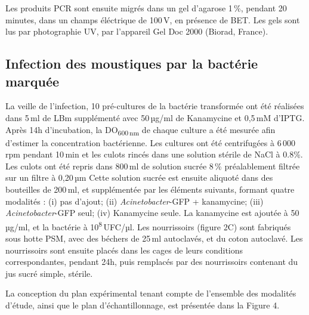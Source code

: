 Les produits PCR sont ensuite migrés dans un gel d'agarose 1\,\%, pendant 20 minutes, dans un champs éléctrique de 100\,V, en présence de BET.
Les gels sont lus par photographie UV, par l'appareil Gel Doc 2000 (Biorad, France).

\subsection{Infection des moustiques par la bactérie marquée}

La veille de l’infection, 10 pré-cultures de la bactérie transformée ont été réalisées dans 5\,ml de LBm supplémenté avec 50\,µg/ml de Kanamycine et 0,5\,mM d'IPTG.
Après 14h d'incubation, la DO\textsubscript{600\,nm} de chaque culture a été mesurée afin d'estimer la concentration bactérienne.
Les cultures ont été centrifugées à 6\,000\,rpm pendant 10\,min et les culots rincés dans une solution stérile de NaCl à 0.8\%.
Les culots ont été repris dans 800\,ml de solution sucrée 8\,\% préalablement filtrée sur un filtre à 0,20\,µm
Cette solution sucrée est ensuite aliquoté dans des bouteilles de 200\,ml, et supplémentée par les éléments suivants, formant quatre modalités :
(i) pas d'ajout; (ii) \textit{Acinetobacter}-GFP + kanamycine; (iii) \textit{Acinetobacter}-GFP seul; (iv) Kanamycine seule.
La kanamycine est ajoutée à 50\,µg/ml, et la bactérie à 10\textsuperscript{8}\,UFC/µl.
Les nourrissoirs (figure 2C) sont fabriqués sous hotte PSM, avec des béchers de 25\,ml autoclavés, et du coton autoclavé.
Les nourrissoirs sont ensuite placés dans les cages de leurs conditions correspondantes, pendant 24h, puis remplacés par des nourrissoirs contenant du jus sucré simple, stérile.


La conception du plan expérimental tenant compte de l’ensemble des modalités d’étude, ainsi que le plan d'échantillonnage, est présentée dans la Figure 4.

